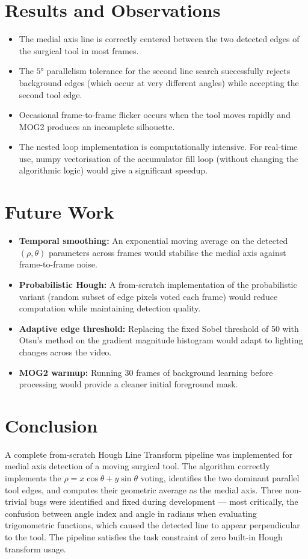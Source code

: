 \documentclass[journal]{IEEEtran}
\begin{document}
\section{Results and Observations}
\begin{itemize}
    \item The medial axis line is correctly centered between the two detected 
    edges of the surgical tool in most frames.
    \item The $5°$ parallelism tolerance for the second line search successfully 
    rejects background edges (which occur at very different angles) while 
    accepting the second tool edge.
    \item Occasional frame-to-frame flicker occurs when the tool moves rapidly 
    and MOG2 produces an incomplete silhouette. 
    \item The nested loop implementation is computationally intensive. For real-time 
    use, numpy vectorisation of the accumulator fill loop (without changing 
    the algorithmic logic) would give a significant speedup.
\end{itemize}

\section{Future Work}
\begin{itemize}
    \item \textbf{Temporal smoothing:} An exponential moving average on the 
    detected $(\rho, \theta)$ parameters across frames would stabilise the 
    medial axis against frame-to-frame noise.
    \item \textbf{Probabilistic Hough:} A from-scratch implementation of the 
    probabilistic variant (random subset of edge pixels voted each frame) 
    would reduce computation while maintaining detection quality.
    \item \textbf{Adaptive edge threshold:} Replacing the fixed Sobel threshold 
    of 50 with Otsu's method on the gradient magnitude histogram would adapt 
    to lighting changes across the video.
    \item \textbf{MOG2 warmup:} Running 30 frames of background learning before 
    processing would provide a cleaner initial foreground mask.
\end{itemize}

\section{Conclusion}
A complete from-scratch Hough Line Transform pipeline was implemented for 
medial axis detection of a moving surgical tool. The algorithm correctly 
implements the $\rho = x\cos\theta + y\sin\theta$ voting, identifies 
the two dominant parallel tool edges, and computes their geometric average 
as the medial axis. Three non-trivial bugs were identified and fixed during 
development — most critically, the confusion between angle index and angle 
in radians when evaluating trigonometric functions, which caused the detected 
line to appear perpendicular to the tool. The pipeline satisfies the task 
constraint of zero built-in Hough transform usage.
\end{document}
